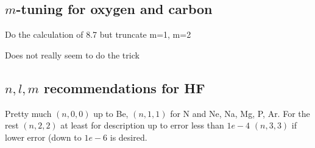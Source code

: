 \subsection{$m$-tuning for oxygen and carbon}
Do the calculation of 8.7 but truncate m=1, m=2

Does not really seem to do the trick

\subsection{$n,l,m$ recommendations for HF}
Pretty much $(n, 0, 0)$ up to Be, $(n, 1, 1)$ for N and Ne, Na, Mg, P, Ar.
For the rest $(n, 2, 2)$ at least for description up to error less than $1e-4$
$(n, 3, 3)$ if lower error (down to $1e-6$ is desired.
